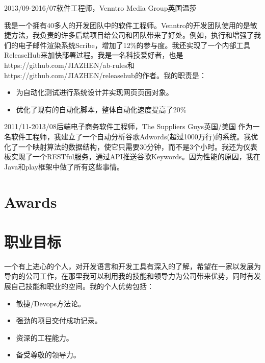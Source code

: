 \documentclass[a4paper]{twentysecondcv-chinese} %
\begin{document}
\begin{twenty}
    \twentyitem
	    {2013/09-2016/07}{软件工程师，Venntro Media Group}{英国温莎}
    	{我是一个拥有40多人的开发团队中的软件工程师。Venntro的开发团队使用的是敏捷方法，我负责的许多后端项目给公司和团队带来了好处。例如，执行和增强了我们的电子邮件渲染系统Scribe，增加了12\%的参与度。我还实现了一个内部工具ReleaseHub来加快部署过程。我是一名科技爱好者，也是https://github.com/JIAZHEN/ab-rules和https://github.com/JIAZHEN/releasehub的作者。我的职责是：
        	\begin{itemize}
              \item 为自动化测试进行系统设计并实现网页页面对象。
              \item 优化了现有的自动化脚本，整体自动化速度提高了20\%
            \end{itemize}}
    \twentyitem
	    {2011/11-2013/08}{后端电子商务软件工程师，The Suppliers Guys}{英国/美国}
    	{作为一名软件工程师，我建立了一个自动分析谷歌Adwords(超过1000万行)的系统。我优化了一个映射算法的数据结构，使它只需要30分钟，而不是3个小时。我还为仪表板实现了一个RESTful服务，通过API推送谷歌Keywords。因为性能的原因，我在Java和play框架中做了所有这些事情。}
\end{twenty}

\section{Awards}

\begin{twentyshort} %
\end{twentyshort}

\newpage %

\makesidebar

\section{职业目标}

一个有上进心的个人，对开发语言和开发工具有深入的了解，希望在一家以发展为导向的公司工作，在那里我可以利用我的技能和领导力为公司带来优势，同时有发展自己技能和职业的空间。我的个人优势包括：
\begin{itemize}
  \item 敏捷/Devops方法论。
  \item 强劲的项目交付成功记录。
  \item 资深的工程能力。
  \item 备受尊敬的领导力。
\end{itemize}
\end{document}
